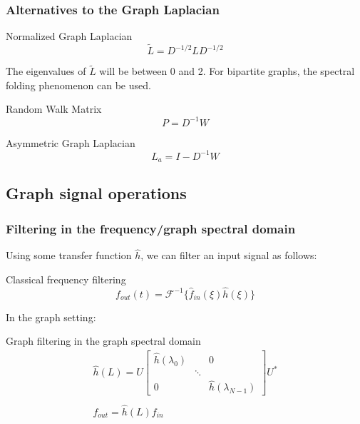 \documentclass{beamer}
\begin{document}
\begin{frame}
  \frametitle{Alternatives to the Graph Laplacian}

  \begin{block}{Normalized Graph Laplacian}
    \begin{equation}
      \tilde{L} = D^{-1/2} L D^{-1/2}
    \end{equation}
  \end{block}

  The eigenvalues of $\tilde{L}$ will be between 0 and 2. For bipartite graphs,
  the spectral folding phenomenon can be used.

  \begin{block}{Random Walk Matrix}
    \begin{equation}
      P = D^{-1} W
    \end{equation}
  \end{block}

  \begin{block}{Asymmetric Graph Laplacian}
    \begin{equation}
      L_a = I - D^{-1} W
    \end{equation}
  \end{block}
  
\end{frame}

\subsection{Graph signal operations}

\begin{frame}
  \frametitle{Filtering in the frequency/graph spectral domain}

  Using some transfer function $\hat{h}$, we can filter an input signal as follows:
  \begin{block}{Classical frequency filtering}
    \begin{equation}
      f_{out}(t) = \mathcal{F}^{-1} \{ \hat{f}_{in}(\xi) \hat{h}(\xi)\}
    \end{equation}
  \end{block}

  In the graph setting:
  
  \begin{block}{Graph filtering in the graph spectral domain}
    \begin{equation}
      \begin{split}
        \hat{h}(L) = U
        \begin{bmatrix}
          \hat{h}(\lambda_0) & & 0 \\
           & \ddots & \\
          0 & & \hat{h}(\lambda_{N-1})
        \end{bmatrix}
        U^*
      \\\\
      f_{out} = \hat{h}(L) f_{in}
      \end{split}
    \end{equation}
  \end{block}
  
\end{frame}
\end{document}
